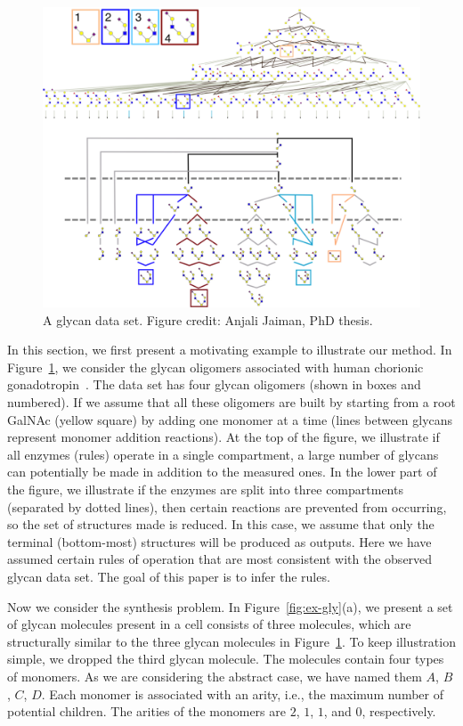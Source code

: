 \begin{figure}[t]
\centering
\includegraphics[width=0.8\linewidth]{gfig2.png}
\caption{A glycan data set. Figure credit: Anjali Jaiman, PhD thesis.}
\label{fig:dataset-gly}
\end{figure}



In this section, we first present a motivating example to illustrate our method.
In Figure~\ref{fig:dataset-gly},
we consider the glycan oligomers associated with human chorionic
gonadotropin~\cite{Harrd1992}.
The data set has four glycan oligomers (shown in boxes and numbered). If we assume that all these oligomers
are built by starting from a root GalNAc (yellow square) by adding one monomer at a
time (lines between glycans represent monomer addition reactions). At the top of the figure, we illustrate
if all enzymes (rules) operate in a
single compartment, a large number of glycans can potentially be made in addition to the measured ones.
In the lower part of the figure, we illustrate if the enzymes are split into three compartments
(separated by dotted lines), then certain reactions are prevented from occurring, so the set of structures
made is reduced.
In this case, we assume that only the terminal (bottom-most) structures will be produced as outputs.
Here we have assumed certain rules of operation that are most consistent with the observed glycan data set.
The goal of this paper is to infer the rules.


Now we consider the synthesis problem. In Figure~\ref{fig:ex-gly}(a), we present a set of
glycan molecules present in a cell consists of three molecules, which are structurally similar to the three glycan molecules in Figure~\ref{fig:dataset-gly}.
To keep illustration simple, we dropped the third glycan molecule.
The molecules contain four types of monomers.
As we are considering the abstract case, we have named them $A$, $B$, $C$, $D$.
Each monomer is associated with an arity, i.e., the maximum number of potential children.
The arities of the monomers are $2$, $1$, $1$, and $0$, respectively.

